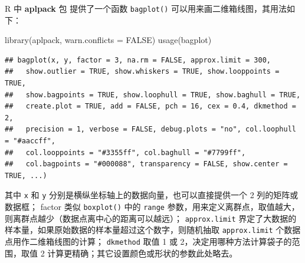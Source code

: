 \documentclass[
  b5paper,
  UTF8,twoside]{book}
\newenvironment{Shaded}{\begin{snugshade}}{\end{snugshade}}
\newcommand{\AttributeTok}[1]{\textcolor[rgb]{0.77,0.63,0.00}{#1}}
\newcommand{\ConstantTok}[1]{\textcolor[rgb]{0.00,0.00,0.00}{#1}}
\newcommand{\FunctionTok}[1]{\textcolor[rgb]{0.00,0.00,0.00}{#1}}
\newcommand{\NormalTok}[1]{#1}
\begin{document}
R 中 \textbf{aplpack} 包 \citep{aplpack} 提供了一个函数 \texttt{bagplot()} 可以用来画二维箱线图，其用法如下：

\begin{Shaded}
\begin{Highlighting}[]
\FunctionTok{library}\NormalTok{(aplpack, }\AttributeTok{warn.conflicts =} \ConstantTok{FALSE}\NormalTok{)}
\FunctionTok{usage}\NormalTok{(bagplot)}
\end{Highlighting}
\end{Shaded}

\begin{verbatim}
## bagplot(x, y, factor = 3, na.rm = FALSE, approx.limit = 300,
##   show.outlier = TRUE, show.whiskers = TRUE, show.looppoints = TRUE,
##   show.bagpoints = TRUE, show.loophull = TRUE, show.baghull = TRUE,
##   create.plot = TRUE, add = FALSE, pch = 16, cex = 0.4, dkmethod = 2,
##   precision = 1, verbose = FALSE, debug.plots = "no", col.loophull = "#aaccff",
##   col.looppoints = "#3355ff", col.baghull = "#7799ff",
##   col.bagpoints = "#000088", transparency = FALSE, show.center = TRUE, ...)
\end{verbatim}

其中 \texttt{x} 和 \texttt{y} 分别是横纵坐标轴上的数据向量，也可以直接提供一个 2 列的矩阵或数据框； factor 类似 \texttt{boxplot()} 中的 \texttt{range} 参数，用来定义离群点，取值越大，则离群点越少（数据点离中心的距离可以越远）； \texttt{approx.limit} 界定了大数据的样本量，如果原始数据的样本量超过这个数字，则随机抽取 \texttt{approx.limit} 个数据点用作二维箱线图的计算； \texttt{dkmethod} 取值 1 或 2，决定用哪种方法计算袋子的范围，取值 2 计算更精确；其它设置颜色或形状的参数此处略去。
\end{document}
